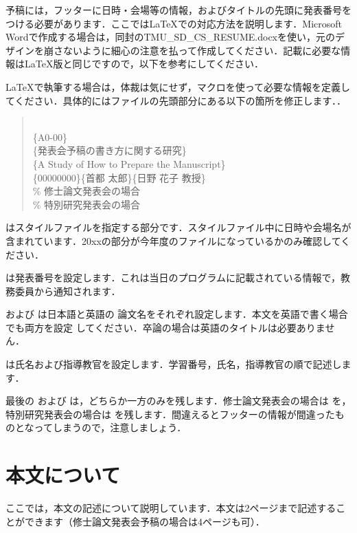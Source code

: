 \documentclass[platex,dvipdfmx]{jsarticle}
\begin{document}
予稿には，フッターに日時・会場等の情報，およびタイトルの先頭に発表番号をつける必要があります．ここでは{\LaTeX}での対応方法を説明します．Microsoft Wordで作成する場合は，同封のTMU\_SD\_CS\_RESUME.docxを使い，元のデザインを崩さないように細心の注意を払って作成してください．記載に必要な情報は{\LaTeX}版と同じですので，以下を参考にしてください．

{\LaTeX}で執筆する場合は，体裁は気にせず，マクロを使って必要な情報を定義してください．具体的にはファイルの先頭部分にある以下の箇所を修正します．．

\begin{quote}
\\
\{A0-00\}\\
\{発表会予稿の書き方に関する研究\}\\
\{A Study of How to Prepare the Manuscript\}\\
\{00000000\}\{首都 太郎\}\{日野 花子 教授\}\\
   \% 修士論文発表会の場合\\
 \% 特別研究発表会の場合
\end{quote}

はスタイルファイルを指定する部分です．スタイルファイル中に日時や会場名が含まれています．20xxの部分が今年度のファイルになっているかのみ確認してください．

 は発表番号を設定します．これは当日のプログラムに記載されている情報で，教務委員から通知されます．

 および  は日本語と英語の
論文名をそれぞれ設定します．本文を英語で書く場合でも両方を設定
してください．卒論の場合は英語のタイトルは必要ありません．

 は氏名および指導教官を設定します．学習番号，氏名，指導教官の順で記述します．

最後の  および  は，どちらか一方のみを残します．修士論文発表会の場合は  を，特別研究発表会の場合は を残します．間違えるとフッターの情報が間違ったものとなってしまうので，注意しましょう．

\section{本文について}
ここでは，本文の記述について説明しています．本文は2ページまで記述することができます（修士論文発表会予稿の場合は4ページも可）．
\end{document}
